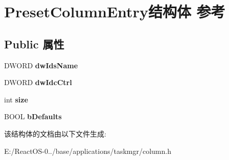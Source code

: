 \hypertarget{struct_preset_column_entry}{}\section{Preset\+Column\+Entry结构体 参考}
\label{struct_preset_column_entry}
\subsection*{Public 属性}
\begin{DoxyCompactItemize}
\item 
\mbox{\label{struct_preset_column_entry_af0bfdefee478e1b8866eb7251a43d09b}} 
D\+W\+O\+RD {\bfseries dw\+Ids\+Name}
\item 
\mbox{\label{struct_preset_column_entry_ac2de1d924cad43ef2f0ca4efc7052111}} 
D\+W\+O\+RD {\bfseries dw\+Idc\+Ctrl}
\item 
\mbox{\label{struct_preset_column_entry_ac884cce9c2e7a0af59693cf3fa08afe4}} 
int {\bfseries size}
\item 
\mbox{\label{struct_preset_column_entry_af32ede05812b79d5d6733302827bf79b}} 
B\+O\+OL {\bfseries b\+Defaults}
\end{DoxyCompactItemize}


该结构体的文档由以下文件生成\+:\begin{DoxyCompactItemize}
\item 
E\+:/\+React\+O\+S-\/0../base/applications/taskmgr/column.\+h\end{DoxyCompactItemize}
